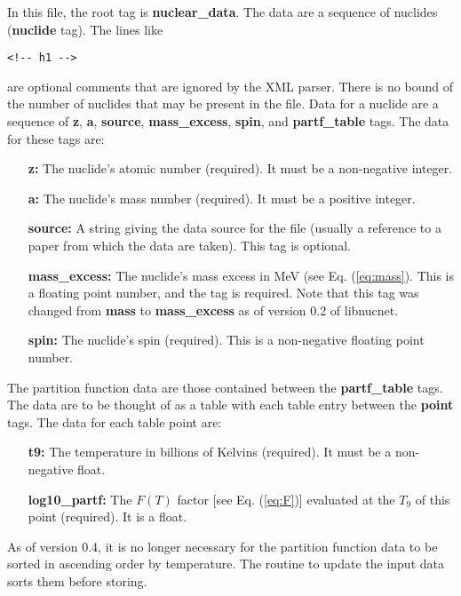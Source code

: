 \documentclass{article}    %
\begin{document}
In this file, the root tag is {\bf nuclear\_data}.  The data are a
sequence of nuclides ({\bf nuclide} tag).  The lines like
\begin{verbatim}
<!-- h1 -->
\end{verbatim}
are optional comments that are ignored by the XML parser. There is
no bound of the number of nuclides that may be present in the file.
Data for a nuclide are a sequence of {\bf z}, {\bf a}, {\bf source},
{\bf mass\_excess}, {\bf spin}, and {\bf partf\_table} tags. The data for
these tags are:
\begin{itemize}

\item[{\bf z:}] The nuclide's atomic number (required).  It must be a
non-negative integer.

\item[{\bf a:}] The nuclide's mass number (required).  It must be a
positive integer.

\item[{\bf source:}] A string giving the data source for the file (usually
a reference to a paper from which the data are taken).  This tag is
optional.

\item[{\bf mass\_excess:}] The nuclide's mass excess in MeV (see Eq.
(\ref{eq:mass}).  This is a floating point number, and the tag is
required.  Note that this tag was changed from {\bf mass}
to {\bf mass\_excess} as of version 0.2 of libnucnet.

\item[{\bf spin:}] The nuclide's spin (required).  This is a non-negative
floating point number.

\end{itemize}

The partition function data are those contained between the {\bf
partf\_table} tags.  The data are to be thought of as a table with
each table entry between the {\bf point} tags.  The data for each
table point are:
\begin{itemize}

\item[{\bf t9:}] The temperature in billions of Kelvins (required).  It
must be a non-negative float.

\item[{\bf log10\_partf:}]  The $F(T)$ factor [see Eq. (\ref{eq:F})]
evaluated at the $T_9$ of this point (required).  It is a float.

\end{itemize}
As of version 0.4, it is no longer necessary for the partition function
data to be sorted
in ascending order by temperature.  The routine to update the input data sorts
them before storing.
\end{document}
